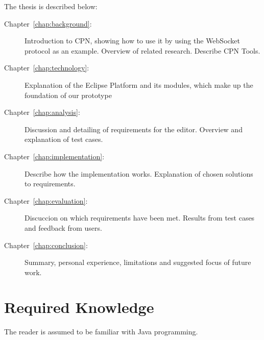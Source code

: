 The thesis is described below:

\begin{description}
\item[Chapter~\ref{chap:background}:~] Introduction to
CPN, showing how to use it by using the WebSocket protocol as an example.
Overview of related research. Describe CPN Tools.
\item [Chapter~\ref{chap:technology}:~] Explanation of
the Eclipse Platform and its modules, which make up the foundation of our
prototype
\item [Chapter~\ref{chap:analysis}:~] Discussion and
detailing of requirements for the editor. Overview and explanation of test cases.
\item [Chapter~\ref{chap:implementation}:~]
Describe how the implementation works. Explanation of chosen solutions to requirements. 
\item [Chapter~\ref{chap:evaluation}:~] Discuccion on
which requirements have been met. Results from test cases and feedback from
users.
\item [Chapter~\ref{chap:conclusion}:~] Summary,
personal experience, limitations and suggested focus of future work.
\end{description}

\section{Required Knowledge}

The reader is assumed to be familiar with Java programming.